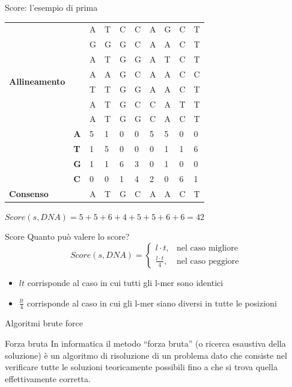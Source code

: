 	\begin{frame}{Score: l'esempio di prima}
		\begin{center}
			\begin{tabular}{l l l l l l l l l l}
				\multirow{8}{*}{\textbf{Allineamento}} & & A & T & C & C & A & G & C & T\\
				& & G & G & G & C & A & A & C & T\\
				& & A & T & G & G & A & T & C & T\\
				& & A & A & G & C & A & A & C & C\\
				& & T & T & G & G & A & A & C & T\\
				& & A & T & G & C & C & A & T & T\\
				& & A & T & G & G & C & A & C & T\\
				\hline
				\multirow{4}{*}{\textbf{Profilo}} & \textbf{A} & 5 & 1 & 0 & 0 & 5 & 5 & 0 & 0\\
				& \textbf{T} & 1 & 5 & 0 & 0 & 0 & 1 & 1 & 6\\
				& \textbf{G} & 1 & 1 & 6 & 3 & 0 & 1 & 0 & 0\\
				& \textbf{C} & 0 & 0 & 1 & 4 & 2 & 0 & 6 & 1\\
				\hline
				\textbf{Consenso} & & A & T & G & C & A & A & C & T 
			\end{tabular}
		\end{center}
		$Score(s,DNA) = 5+5+6+4+5+5+6+6=42$
	\end{frame}
	
	\begin{frame}{Score}
		Quanto può valere lo score?
		\begin{equation*}
			Score(s,DNA) = \begin{cases}
				l\cdot t, & \mbox{nel caso migliore}\\
				\frac{l\cdot t}{4}, & \mbox{nel caso peggiore}
			\end{cases}
		\end{equation*}
		\begin{itemize}
			\item $lt$ corrisponde al caso in cui tutti gli l-mer sono identici
			\item $\frac{lt}{4}$ corrisponde al caso in cui gli l-mer siano diversi in tutte le posizioni
		\end{itemize}
	\end{frame}
	
	\begin{frame}{Algoritmi brute force}
		\begin{block}{Forza bruta}
			In informatica il metodo ``forza bruta'' (o ricerca esaustiva della soluzione) è un algoritmo di risoluzione di un problema dato che consiste nel verificare tutte le soluzioni teoricamente possibili fino a che si trova quella effettivamente corretta.
		\end{block}
	\end{frame}
	
